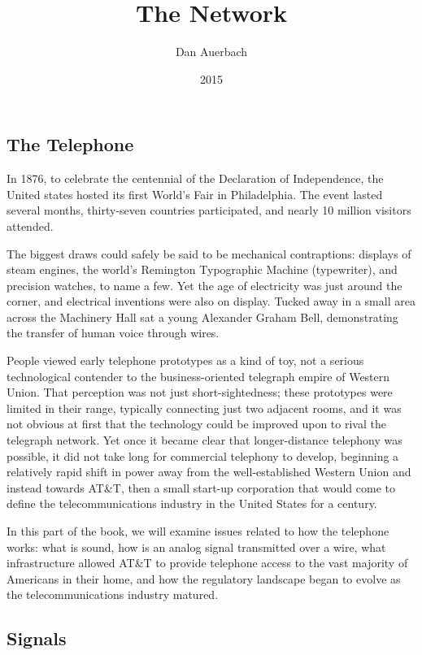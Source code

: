 \documentclass[UTF8]{book}
\begin{document}
\begin{CJK}{UTF8}{gbsn}

\title{The Network}
\author{Dan Auerbach}
\date{2015}
\maketitle

\part{The Telephone}

In 1876, to celebrate the centennial of the Declaration of Independence, the United states hosted its first World's Fair in Philadelphia. The event lasted several months, thirty-seven countries participated, and nearly 10 million visitors attended.

The biggest draws could safely be said to be mechanical contraptions: displays of steam engines, the world's Remington Typographic Machine (typewriter), and precision watches, to name a few. Yet the age of electricity was just around the corner, and electrical inventions were also on display. Tucked away in a small area across the Machinery Hall sat a young Alexander Graham Bell, demonstrating the transfer of human voice through wires.

People viewed early telephone prototypes as a kind of toy, not a serious technological contender to the business-oriented telegraph empire of Western Union. That perception was not just short-sightedness; these prototypes were limited in their range, typically connecting just two adjacent rooms, and it was not obvious at first that the technology could be improved upon to rival the telegraph network. Yet once it became clear that longer-distance telephony was possible, it did not take long for commercial telephony to develop, beginning a relatively rapid shift in power away from the well-established Western Union and instead towards AT\&T, then a small start-up corporation that would come to define the telecommunications industry in the United States for a century.

In this part of the book, we will examine issues related to how the telephone works: what is sound, how is an analog signal transmitted over a wire, what infrastructure allowed AT\&T to provide telephone access to the vast majority of Americans in their home, and how the regulatory landscape began to evolve as the telecommunications industry matured.

\chapter{Signals}


\end{CJK}
\end{document}
